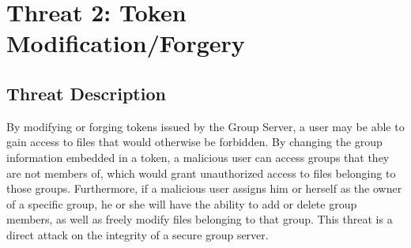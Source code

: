 \documentclass[11pt]{article}
\begin{document}
\section{Threat 2: Token Modification/Forgery}
\subsection{Threat Description}
By modifying or forging tokens issued by the Group Server, a user may be able to gain access to files that would otherwise be forbidden. By changing the group information embedded in a token, a malicious user can access groups that they are not members of, which would grant unauthorized access to files belonging to those groups. Furthermore, if a malicious user assigns him or herself as the owner of a specific group, he or she will have the ability to add or delete group members, as well as freely modify files belonging to that group. This threat is a direct attack on the integrity of a secure group server.
\end{document}
